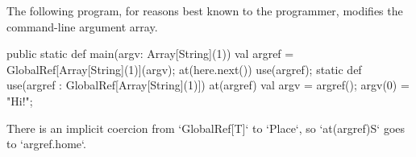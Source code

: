 \begin{ex}The following program, for reasons best known to the programmer,
modifies the 
command-line argument array.


% 
\begin{xten}
  public static def main(argv: Array[String](1)) {
    val argref = GlobalRef[Array[String](1)](argv);
    at(here.next()) 
        use(argref);
  }
  static def use(argref : GlobalRef[Array[String](1)]) {
    at(argref) {
      val argv = argref();
      argv(0) = "Hi!";
    }
  }
\end{xten}

\end{ex}

There is an implicit coercion from \xcd`GlobalRef[T]` to \xcd`Place`, so
\xcd`at(argref)S` goes to \xcd`argref.home`.  


